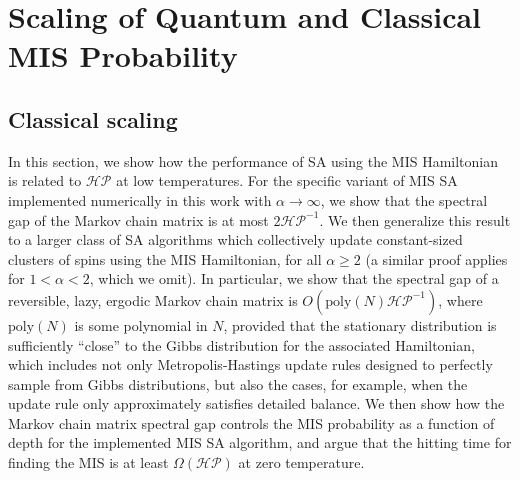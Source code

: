 \documentclass[twocolumn,amssymb,secnumarabic, prl, aps, nofootinbib]{revtex4-1}
\begin{document}
\section{Scaling of Quantum and Classical MIS Probability \label{Sec:scaling}}


\subsection{Classical scaling\label{subsec:classical_scaling}}

In this section, we show how the performance of SA using the MIS Hamiltonian is related to $\mathcal{HP}$ at low temperatures. For the specific variant of MIS SA implemented numerically in this work with $\alpha\rightarrow\infty$, we show that the spectral gap of the Markov chain matrix is at most $2\mathcal{HP}^{-1}$. We then generalize this result to a larger class of SA algorithms which collectively update constant-sized clusters of spins using the MIS Hamiltonian, for all $\alpha \geq 2$ (a similar proof applies for $1<\alpha <2$, which we omit). In particular, we show that the spectral gap of a reversible, lazy, ergodic Markov chain matrix is $O(\text{poly}(N)\mathcal{HP}^{-1})$, where $\text{poly}(N)$ is some polynomial in $N$, provided that the stationary distribution is sufficiently ``close'' to the Gibbs distribution for the associated Hamiltonian, which includes not only Metropolis-Hastings update rules designed to perfectly sample from Gibbs distributions, but also the cases, for example, when the update rule only approximately satisfies detailed balance.
We then show how the Markov chain matrix spectral gap controls the  MIS probability as a function of depth for the implemented MIS SA algorithm, and argue that the hitting time for finding the MIS is at least $\Omega(\mathcal{HP})$ at zero temperature.
\\
\end{document}
